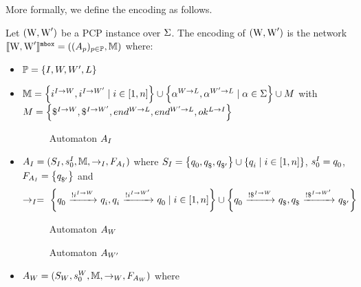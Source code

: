 More formally, we define the encoding as follows. 
\begin{definition}\label{def:encodingMail}
 Let $(\text{W},\text{W}')$ be a PCP instance over $\Sigma$. 
The encoding of $(\text{W},\text{W}')$ is the network $\llbracket \mathcal{\text{W},\text{W}'} \rrbracket ^{\mathtt{mbox}} =  \left((A_{p})_{p \in \mathbb{P}}, \mathbb{M}\right)$ where:
\begin{itemize}
	\item $\mathbb{P} = \left\{ I, W, W', L\right\} $
	\item $\mathbb{M} = \left\{ i^{I \rightarrow W}, i^{I \rightarrow W'} \mid i \in [1,n]\right\} \cup \left\{ \alpha^{W \rightarrow L},\alpha^{W' \rightarrow L} \mid \alpha \in \Sigma \right\} \cup M $ with\\
		$ M = \left\{ \$^{I \rightarrow W}, \$^{I \rightarrow W'}, end^{W \rightarrow L}, end^{W' \rightarrow L}, ok^{L \rightarrow I}\right\} $
\begin{figure}[t]
	\centering
	
	\caption{Automaton $A_{I}$} 
	\label{figure:example:encodingMailAutBI}
\end{figure}
	\item  $A_{I} = (S_{I}, {s}_{0}^{I}, \mathbb{M}, \rightarrow_I, F_{A_{I}} )$ where $S_{I} = \left\{{q}_{0}^{}, {q}_{\$}^{}, {q}_{\$'}^{}\right\} \cup \left\{ {q}_{i}^{} \mid i \in [1,n] \right\}$, ${s}_{0}^{I} = {q}_{0}^{}$, $F_{A_{I}} = {\left\lbrace {q}_{\$'}^{} \right\rbrace}$ and 
		$$ 
		\rightarrow_I  = \ \left\{ {q}_{0}^{}\ { \xrightarrow[{}^{}]{!i^{I \rightarrow W}}}\ {q}_{i}^{},
					{q}_{i}^{}\ { \xrightarrow[{}^{}]{!i^{I \rightarrow W'}}}\ {q}_{0}^{}			
					\mid i \in [1,n]\right\} 
		 \cup \left\{ {q}_{0}^{}\ { \xrightarrow[{}^{}]{!\$^{I \rightarrow W}}}\ {q}_{\$}^{},
		 {q}_{\$}^{}\ { \xrightarrow[{}^{}]{!\$^{I \rightarrow W'}}}\ {q}_{\$'}^{} \right\} $$
\begin{figure}[t]
	\centering
	
	\caption{Automaton $A_{W}$} 
	\label{figure:example:encodingMailAutBW}
\end{figure}
\begin{figure}[t]
	\centering
	
	\caption{Automaton $A_{W'}$} 
	\label{figure:example:encodingMailAutBWb}
\end{figure}
	\item  $A_{W} = (S_W, {s}_{0}^{W}, \mathbb{M}, \rightarrow_W, F_{A_{W}})$ where 

\end{itemize}
\end{definition}
